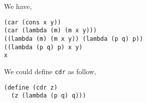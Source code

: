 \documentclass[a4paper,12pt]{article}
\begin{document}
We have,
\begin{lstlisting}
(car (cons x y))
(car (lambda (m) (m x y)))
((lambda (m) (m x y)) (lambda (p q) p))
((lambda (p q) p) x y)
x
\end{lstlisting}
We could define \lstinline!cdr! as follow,
\begin{lstlisting}
(define (cdr z)
  (z (lambda (p q) q)))
\end{lstlisting}
\end{document}
